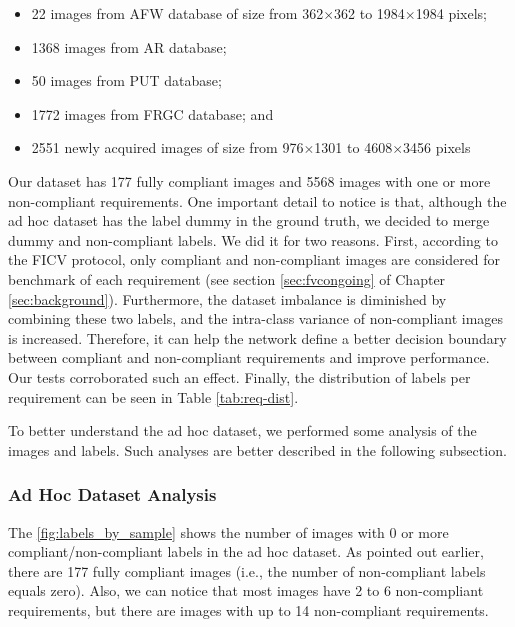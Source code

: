 \begin{itemize}
\item 22 images from AFW database of size from 362$\times$362 to 1984$\times$1984 pixels;
\item 1368 images from AR database;
\item 50 images from PUT database;
\item 1772 images from FRGC database; and
\item 2551 newly acquired images of size from 976$\times$1301 to 4608$\times$3456 pixels
\end{itemize}

Our dataset has 177 fully compliant images and 5568 images with one or more non-compliant requirements. One important detail to notice is that, although the ad hoc dataset has the label dummy in the ground truth, we decided to merge dummy and non-compliant labels. We did it for two reasons. First, according to the FICV protocol, only compliant and non-compliant images are considered for benchmark of each requirement (see section \ref{sec:fvcongoing} of Chapter \ref{sec:background}). Furthermore, the dataset imbalance is diminished by combining these two labels, and the intra-class variance of non-compliant images is increased. Therefore, it can help the network define a better decision boundary between compliant and non-compliant requirements and improve performance. Our tests corroborated such an effect. Finally, the distribution of labels per requirement can be seen in Table \ref{tab:req-dist}. 


To better understand the ad hoc dataset, we performed some analysis of the images and labels. Such analyses are better described in the following subsection.



\subsubsection{Ad Hoc Dataset Analysis}

The \autoref{fig:labels_by_sample} shows the number of images with 0 or more compliant/non-compliant labels in the ad hoc dataset. As pointed out earlier, there are 177 fully compliant images (i.e., the number of non-compliant labels equals zero). Also, we can notice that most images have 2 to 6 non-compliant requirements, but there are images with up to 14 non-compliant requirements.

